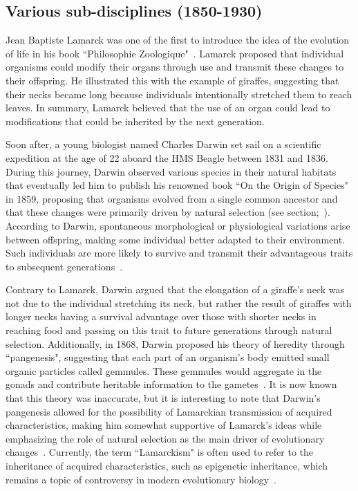 \subsection{Various sub-disciplines (1850-1930)}

Jean Baptiste Lamarck was one of the first to introduce the idea of the evolution of life in his book “Philosophie Zoologique"~\citep{lamarck_philosophie_1809}. Lamarck proposed that individual organisms could modify their organs through use and transmit these changes to their offspring. He illustrated this with the example of giraffes, suggesting that their necks became long because individuals intentionally stretched them to reach leaves. In summary, Lamarck believed that the use of an organ could lead to modifications that could be inherited by the next generation.

Soon after, a young biologist named Charles Darwin set sail on a scientific expedition at the age of 22 aboard the HMS Beagle between 1831 and 1836. During this journey, Darwin observed various species in their natural habitats that eventually led him to publish his renowned book “On the Origin of Species" in 1859, proposing that organisms evolved from a single common ancestor and that these changes were primarily driven by natural selection (see  section;~\citet{darwin_origin_1859}). According to Darwin, spontaneous morphological or physiological variations arise between offspring, making some individual better adapted to their environment. Such individuals are more likely to survive and transmit their advantageous traits to subsequent generations~\citep{nei_selectionism_2005}.

Contrary to Lamarck, Darwin argued that the elongation of a giraffe's neck was not due to the individual stretching its neck, but rather the result of giraffes with longer necks having a survival advantage over those with shorter necks in reaching food and passing on this trait to future generations through natural selection. Additionally, in 1868, Darwin proposed his theory of heredity through “pangenesis", suggesting that each part of an organism's body emitted small organic particles called gemmules. These gemmules would aggregate in the gonads and contribute heritable information to the gametes~\citep{darwin_variation_1868}. It is now known that this theory was inaccurate, but it is interesting to note that Darwin's pangenesis allowed for the possibility of Lamarckian transmission of acquired characteristics, making him somewhat supportive of Lamarck's ideas while emphasizing the role of natural selection as the main driver of evolutionary changes~\citep{kovac_lamarck_2019}. Currently, the term “Lamarckism" is often used to refer to the inheritance of acquired characteristics, such as epigenetic inheritance, which remains a topic of controversy in modern evolutionary biology~\citep{burkhardt_lamarck_2013}.

